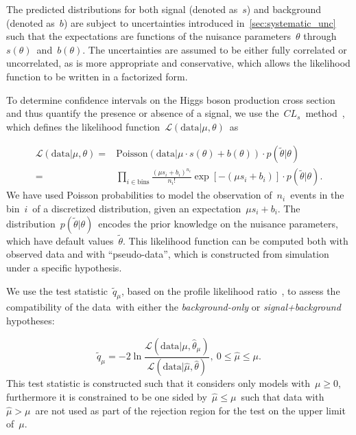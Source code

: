 The predicted distributions for both signal (denoted as~$s$) and background (denoted as~$b$) are subject to uncertainties introduced in~\cref{sec:systematic_unc} such that the expectations are functions of the nuisance parameters~$\theta$ through~$s(\theta)$~and~$b(\theta)$. The uncertainties are assumed to be either fully correlated or uncorrelated, as is more appropriate and conservative, which allows the likelihood function to be written in a factorized form.

To determine confidence intervals on the Higgs boson production cross section and thus quantify the presence or absence of a signal, we use the~$CL_s$~method~\cite{Junk:1999kv,Read:2002}, which defines the likelihood function~$\mathcal{L}(\mathrm{data} | \mu, \theta)$~as

\begin{align}
\label{eq:likelihood}
\mathcal{L}(\mathrm{data} | \mu, \theta) =&  \mathrm{Poisson}(\mathrm{data} | \mu \cdot s(\theta) + b(\theta)) \cdot p(\tilde{\theta} | \theta)\\
=& \prod_{i\in \mathrm{bins}} \frac{(\mu s_i + b_i)^{n_i}}{n_i!} \exp{[-(\mu s_i + b_i)]} \cdot p(\tilde{\theta} | \theta).
\end{align}
We have used Poisson probabilities to model the observation of~$n_i$~events in the bin~$i$~of a discretized distribution, given an expectation~$\mu s_i + b_i$. The distribution~$p(\tilde{\theta} | \theta)$~encodes the prior knowledge on the nuisance parameters, which have default values~$\tilde{\theta}$. This likelihood function can be computed both with observed data and with ``pseudo-data'', which is constructed from simulation under a specific hypothesis.

We use the test statistic~$\tilde{q}_\mu$, based on the profile likelihood ratio~\cite{Cowan:2010js}, to assess the compatibility of the data with either the \textit{background-only} or \textit{signal+background} hypotheses:

\begin{equation}
\tilde{q}_\mu = -2 \ln{\frac{\mathcal{L}(\mathrm{data} | \mu, \hat{\theta}_\mu)}{\mathcal{L}(\mathrm{data} | \hat{\mu}, \hat{\theta})}},\ 0 \le \hat{\mu} \le \mu.
\end{equation}
This test statistic is constructed such that it considers only models with~$\mu \ge 0$, furthermore it is constrained to be one sided by~$\hat{\mu} \le \mu$~such that data with~$\hat{\mu} > \mu$~are not used as part of the rejection region for the test on the upper limit of~$\mu$.

